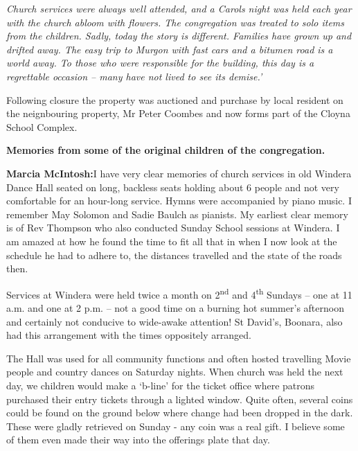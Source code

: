 \emph{Church services were always well attended, and a Carols night was held each year with the church abloom with flowers. The congregation was treated to solo items from the children. Sadly, today the story is different. Families have grown up and drifted away. The easy trip to Murgon with fast cars and a bitumen road is a world away. To those who were responsible for the building, this day is a regrettable occasion -- many have not lived to see its demise.'}



Following closure the property was auctioned and purchase by local resident on the neignbouring property, Mr Peter Coombes and now forms part of the Cloyna School Complex.



\textbf{Memories from some of the original children of the congregation.}



\textbf{Marcia McIntosh:}I have very clear memories of church services in old Windera Dance Hall seated on long, backless seats holding about 6 people and not very comfortable for an hour-long service. Hymns were accompanied by piano music. I remember May Solomon and Sadie Baulch as pianists. My earliest clear memory is of Rev Thompson who also conducted Sunday School sessions at Windera. I am amazed at how he found the time to fit all that in when I now look at the schedule he had to adhere to, the distances travelled and the state of the roads then.



Services at Windera were held twice a month on 2\textsuperscript{nd} and 4\textsuperscript{th} Sundays -- one at 11 a.m. and one at 2 p.m. -- not a good time on a burning hot summer's afternoon and certainly not conducive to wide-awake attention! St David's, Boonara, also had this arrangement with the times oppositely arranged.



The Hall was used for all community functions and often hosted travelling Movie people and country dances on Saturday nights. When church was held the next day, we children would make a `b-line' for the ticket office where patrons purchased their entry tickets through a lighted window. Quite often, several coins could be found on the ground below where change had been dropped in the dark. These were gladly retrieved on Sunday - any coin was a real gift. I believe some of them even made their way into the offerings plate that day.




